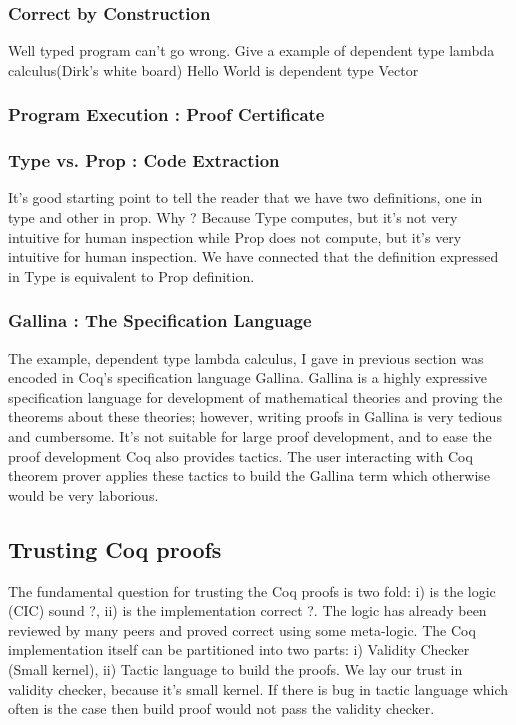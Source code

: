  \subsubsection{Correct by Construction}
  Well typed program can't go wrong. 
  Give a example of dependent type lambda calculus(Dirk's white board)
  Hello World is dependent type Vector 
 \subsubsection{Program Execution : Proof Certificate}
 \subsubsection{Type vs. Prop : Code Extraction}
  It's good starting point to tell the reader that we have two definitions, 
  one in type and other in prop. Why ? Because Type computes, but it's
  not very intuitive for human inspection while Prop does not compute, 
  but it's very intuitive for human inspection. We have connected that 
  the definition expressed in Type is equivalent to Prop definition. 
 
 \subsubsection{Gallina : The Specification Language}
  The example, dependent type lambda calculus, I gave in previous 
  section was encoded in Coq's specification language Gallina. 
  Gallina is a highly expressive specification 
  language for development of mathematical theories and proving the    
  theorems about these  theories; however, writing proofs in Gallina
  is very tedious and cumbersome. It's not suitable for large proof 
  development, and to ease the proof development Coq also provides 
  tactics.  The user interacting with Coq theorem prover applies these 
  tactics to build the  Gallina term  which otherwise would  
  be very laborious.
  
  
 
  

 
 \subsection{Trusting Coq proofs}
  The fundamental question for trusting the Coq proofs is two fold: 
  i) is the logic (CIC) sound ?, ii) is the implementation correct ?. 
  The logic has already been reviewed by many peers and proved correct 
  using some meta-logic. The 
  Coq implementation itself can be partitioned into two parts: 
  i) Validity Checker (Small kernel), 
  ii) Tactic language to build the proofs.
  We lay our trust in validity checker, because it's small kernel. If there
  is bug in tactic language which often is the case then build proof would 
  not pass the validity checker.  
  
